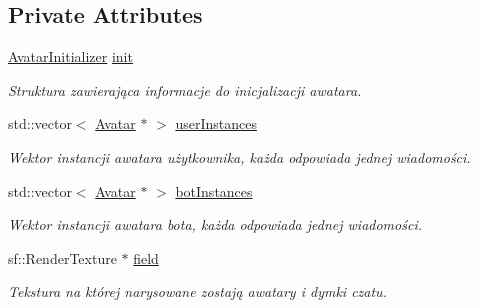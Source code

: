 \subsection*{Private Attributes}
\begin{DoxyCompactItemize}
\item 
\mbox{\label{class_conversation_field_a6af6b93de400ad597ceeb6b8f0b42513}} 
\mbox{\hyperlink{struct_avatar_initializer}{Avatar\+Initializer}} \mbox{\hyperlink{class_conversation_field_a6af6b93de400ad597ceeb6b8f0b42513}{init}}
\begin{DoxyCompactList}\small\item\em Struktura zawierająca informacje do inicjalizacji awatara. \end{DoxyCompactList}\item 
\mbox{\label{class_conversation_field_a91e0b7456422a0684bd6b4bf65decfe8}} 
std\+::vector$<$ \mbox{\hyperlink{class_avatar}{Avatar}} $\ast$ $>$ \mbox{\hyperlink{class_conversation_field_a91e0b7456422a0684bd6b4bf65decfe8}{user\+Instances}}
\begin{DoxyCompactList}\small\item\em Wektor instancji awatara użytkownika, każda odpowiada jednej wiadomości. \end{DoxyCompactList}\item 
\mbox{\label{class_conversation_field_ae6b331994316ac01b66e8f79a8d2439e}} 
std\+::vector$<$ \mbox{\hyperlink{class_avatar}{Avatar}} $\ast$ $>$ \mbox{\hyperlink{class_conversation_field_ae6b331994316ac01b66e8f79a8d2439e}{bot\+Instances}}
\begin{DoxyCompactList}\small\item\em Wektor instancji awatara bota, każda odpowiada jednej wiadomości. \end{DoxyCompactList}\item 
\mbox{\label{class_conversation_field_a5c8b703113dd5fc69f0421bc3b8650b7}} 
sf\+::\+Render\+Texture $\ast$ \mbox{\hyperlink{class_conversation_field_a5c8b703113dd5fc69f0421bc3b8650b7}{field}}
\begin{DoxyCompactList}\small\item\em Tekstura na której narysowane zostają awatary i dymki czatu. \end{DoxyCompactList}\item 

\end{DoxyCompactItemize}
